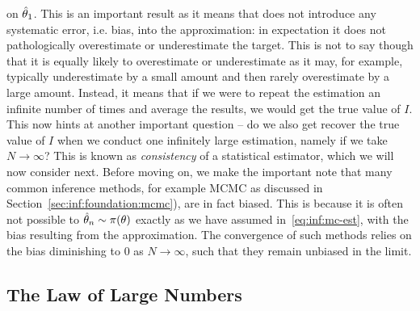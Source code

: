 on $\hat{\theta}_1$.  This is an important result as it means that \mc does not introduce
any systematic error, i.e. bias, into the approximation: in expectation it does not
pathologically overestimate or underestimate the target.  This is not to say though that it is
equally likely to overestimate or underestimate as it may, for example, typically underestimate
by a small amount and then rarely overestimate by a large amount.  Instead, it means that if we
were to repeat the estimation an infinite number of times and average the results, we would
get the true value of $I$.  This now hints at another important question -- do we also get
recover the true value of $I$ when we conduct one infinitely large estimation, namely if we
take $N\rightarrow\infty$?  This is known as \emph{consistency} of a statistical estimator,
which we will now consider next.  Before moving
on, we make the important note that many common \mc inference methods, for example MCMC as
discussed in Section~\ref{sec:inf:foundation:mcmc}), are in fact biased.  
This is because it is often not possible to $\hat{\theta}_n \sim \pi(\theta)$
exactly as we have assumed in~\eqref{eq:inf:mc-est}, with the bias resulting from
the approximation.  The convergence of such methods relies on the bias 
diminishing to $0$ as $N\rightarrow\infty$, such that they remain unbiased in the limit.

\subsection{The Law of Large Numbers}
\label{sec:inf:mc:law}


